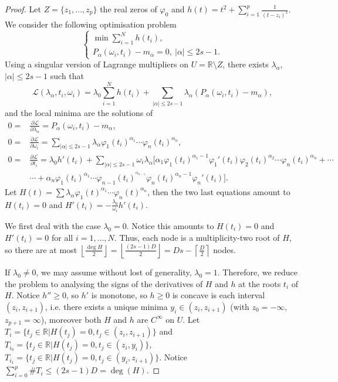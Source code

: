 \documentclass[11pt,a4paper]{amsart}
\numberwithin{equation}{section}
\theoremstyle{definition}
\newcommand{\R}{\mathbb{R}}
\numberwithin{thm}{section}
\theoremstyle{break}
\numberwithin{subcase}{case}
\begin{document}
\begin{proof}
    Let $Z=\{z_1,\dots,z_p\}$ the real zeros of $\varphi_0$ and $h(t)=t^2+\sum_{i=1}^p\frac{1}{(t-z_i)^2}$. We consider the following optimisation problem $$
    \begin{cases}
        \min \sum^N_{i=1} h(t_i),\\
        P_\alpha(\omega_i,t_i)-m_\alpha=0,\ |\alpha|\leq 2s-1.
    \end{cases}
    $$
    Using a singular version of Lagrange multipliers \cite[Theorem
6.1.1, Remark 6.1.2(iv)]{Cla90} on $U=\mathbb R\setminus Z$, there exists $\lambda_\alpha$, $|\alpha|\leq 2s-1$ such that $$\mathcal L(\lambda_{\alpha}, t_i,\omega_i)={\lambda_0}\sum_{i=1}^N h(t_i)+\sum_{|\alpha|\leq 2s-1} \lambda_{\alpha}(P_{\alpha}(\omega_i,t_i)-m_{\alpha}),$$ and the local minima are the solutions of 
        \begin{align*}
             0=&\frac{\partial\mathcal L}{\partial \lambda_{\alpha}}=P_{\alpha}(\omega_i,t_i)-m_{\alpha},\\
     0=&\frac{\partial\mathcal L}{\partial \omega_i}=\sum_{|\alpha|\leq 2s-1}\lambda_{\alpha}\varphi_1(t_i)^{\alpha_1}\cdots\varphi_n(t_i)^{\alpha_n},\\
     0=&\frac{\partial\mathcal L}{\partial t_i}={\lambda_0}h'(t_i) +\sum_{|\alpha|\leq 2s-1}\omega_i\lambda_{\alpha}[\alpha_1\varphi_1(t_i)^{\alpha_1-1}\varphi_1'(t_i)\varphi_2(t_i)^{\alpha_2}\cdots \varphi_n(t_i)^{\alpha_n}+\cdots\\   &\cdots +\alpha_n\varphi_1(t_i)^{\alpha_1}\cdots \varphi_{n-1}(t_i)^{^{\alpha_{n-1}}}\varphi_n(t_i)^{\alpha_n-1}\varphi_n'(t_i)].
    \end{align*}
    Let $H(t)=\sum \lambda_{\alpha}\varphi_1(t)^{\alpha_1}\cdots\varphi_n(t)^{\alpha_n}$, then the two last equations amount to $H(t_i)=0$ and $H'(t_i)=-\frac{{\lambda_0}}{\omega_i}h'(t_i)$. 
    
    {We first deal with the case ${\lambda_0= 0}$. Notice this amounts to $H(t_i)=0$ and $H'(t_i)=0$ for all $i=1,\dots, N$}. Thus, each node is a multiplicity-two root of $H$, so there are at most $\left\lfloor \frac{\deg H}{2}\right\rfloor= \left\lfloor \frac{(2s-1)D}{2}\right\rfloor= Ds-\left\lceil\frac{D}{2}\right\rceil$ nodes.

   {If $\lambda_0\neq0$, we may assume without lost of generality, $\lambda_0=1$}. Therefore, we reduce the problem to analysing the signs of the derivatives of $H$ and $h$ at the roots $t_i$ of $H$. Notice $h''\geq 0$, so $h'$ is monotone, so $h\geq0$ is concave is each interval $(z_i,z_{i+1})$, i.e. there exists a unique minima $y_i\in(z_i,z_{i+1})$ (with $z_0=-\infty$,$z_{p+1}=\infty$), moreover both $H$ and $h$ are $C^\infty$ on $U$. Let $T_i=\{t_j\in\R|H(t_j)=0, t_j\in (z_i,z_{i+1})\}$ and $T_{i_0}=\{t_j\in\R|H(t_j)=0, t_j\in (z_i,y_i)\}$, $T_{i_1}=\{t_j\in\R|H(t_j)=0, t_j\in (y_i,z_{i+1})\}$. Notice $\sum_{i=0}^p \#T_i\leq (2s-1)D=\deg(H)$.


\end{proof}
\end{document}
